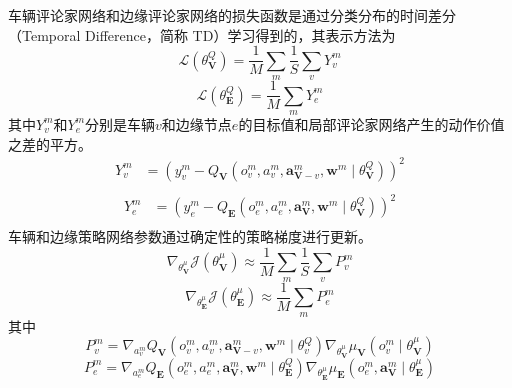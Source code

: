 车辆评论家网络和边缘评论家网络的损失函数是通过分类分布的时间差分（Temporal Difference，简称 TD）学习得到的，其表示方法为 
\begin{equation}
	\mathcal{L}\left(\theta_{\mathbf{V}}^{Q}\right)=\frac{1}{M} \sum_{m} \frac{1}{S} \sum_{v} {Y_v^{m}}
\end{equation}
\begin{equation}
	\mathcal{L}\left(\theta_{\mathbf{E}}^{Q}\right)=\frac{1}{M} \sum_{m} {Y_e^{m}}
\end{equation}
\noindent 其中$Y_v^{m}$和$Y_e^{m}$分别是车辆$v$和边缘节点$e$的目标值和局部评论家网络产生的动作价值之差的平方。
\begin{equation}
	\begin{aligned}
		Y_v^{m} &= \left(y_{v}^{m}-Q_{\mathbf{V}}\left({o}_{v}^{m},  {a}_{v}^{m}, \boldsymbol{a}_{\boldsymbol{\mathbf{V}}-v}^{m}, \boldsymbol{w}^{m} \mid \theta_{\mathbf{V}}^{Q} \right)\right)^{2} \\
	\end{aligned}
\end{equation}
\begin{equation}
	\begin{aligned}
		Y_e^{m} &=\left(y_{e}^{m}-Q_{\mathbf{E}}\left({o}_{e}^{m},  {a}_{e}^{m}, \boldsymbol{a}_{\boldsymbol{\mathbf{V}}}^{m}, \boldsymbol{w}^{m} \mid \theta_{\mathbf{V}}^{Q} \right)\right)^{2} \\
	\end{aligned}
\end{equation}
车辆和边缘策略网络参数通过确定性的策略梯度进行更新。
\begin{equation}
	\nabla_{\theta_{\mathbf{V}}^{\mu}} \mathcal{J} (\theta_{\mathbf{V}}^{\mu}) \approx \frac{1}{M} \sum_{m} \frac{1}{S} \sum_{v} P_{v}^{m} 
\end{equation}
\begin{equation}
	\nabla_{\theta_{\mathbf{E}}^{\mu}} \mathcal{J} (\theta_{\mathbf{E}}^{\mu}) \approx \frac{1}{M} \sum_{m} P_{e}^{m} 
\end{equation}
\noindent 其中 
\begin{equation}
P_{v}^{m} = \nabla_{{a}_{v}^{m}} Q_{\mathbf{V}}\left({o}_{v}^{m}, {a}_{v}^{m}, \boldsymbol{a}_{\boldsymbol{\mathbf{V}}-v}^{m}, \boldsymbol{w}^{m} \mid \theta_{v}^{Q} \right) \nabla_{\theta_{\mathbf{V}}^{\mu}} \mu_{\mathbf{V}}\left({o}_{v}^{m} \mid \theta_{\mathbf{V}}^{\mu}\right)
\end{equation}
\begin{equation}
P_{e}^{m} = \nabla_{{a}_{e}^{m}} Q_{\mathbf{E}}\left({o}_{e}^{m}, {a}_{e}^{m}, \boldsymbol{a}_{\boldsymbol{\mathbf{V}}}^{m}, \boldsymbol{w}^{m} \mid \theta_{\mathbf{E}}^{Q} \right) \nabla_{\theta_{\mathbf{E}}^{\mu}} \mu_{\mathbf{E}}\left({o}_{e}^{m}, {\boldsymbol{a}}_{\boldsymbol{\mathbf{V}}}^{m} \mid \theta_{\mathbf{E}}^{\mu}\right)
\end{equation}

